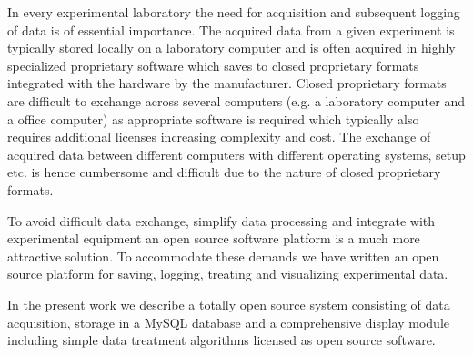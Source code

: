 In every experimental laboratory the need for acquisition and subsequent
logging of data is of essential importance. The acquired data from a given
experiment is typically stored locally on a laboratory computer and is often
acquired in highly specialized proprietary software which saves to closed
proprietary formats integrated with the hardware by the manufacturer. Closed
proprietary formats are difficult to exchange across several computers (e.g. a
laboratory computer and a office computer) as appropriate software is required
which typically also requires additional licenses increasing complexity and
cost. The exchange of acquired data between different computers with different
operating systems, setup etc. is hence cumbersome and difficult due to the
nature of closed proprietary formats.

To avoid difficult data exchange, simplify data processing and integrate with
experimental equipment an open source software platform is a much more
attractive solution\cite{Benn2009,Murray2011,So2007}. To accommodate these
demands we have written an open source platform for saving, logging, treating
and visualizing experimental data. 

In the present work we describe a totally
open source system consisting of data acquisition, storage in a MySQL database
and a comprehensive display module including simple data treatment algorithms
licensed as open source software.
